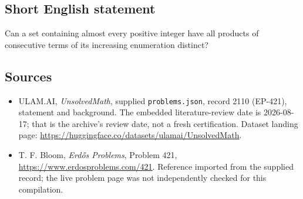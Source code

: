 \documentclass[11pt,a4paper]{article}
\begin{document}
\subsection{Short English statement}

Can a set containing almost every positive integer have all products of consecutive terms of its increasing enumeration distinct?

\subsection{Sources}

{\small

\begin{itemize}

\item[\hypertarget{source:2110:1}{S1}] ULAM.AI, \emph{UnsolvedMath}, supplied \texttt{problems.json}, record 2110 (EP-421), statement and background. The embedded literature-review date is 2026-08-17; that is the archive’s review date, not a fresh certification. Dataset landing page: \url{https://huggingface.co/datasets/ulamai/UnsolvedMath}.

\item[\hypertarget{source:2110:2}{S2}] T. F. Bloom, \emph{Erdős Problems}, Problem 421, \url{https://www.erdosproblems.com/421}. Reference imported from the supplied record; the live problem page was not independently checked for this compilation.

\end{itemize}

}

\label{end:2110}
\end{document}
